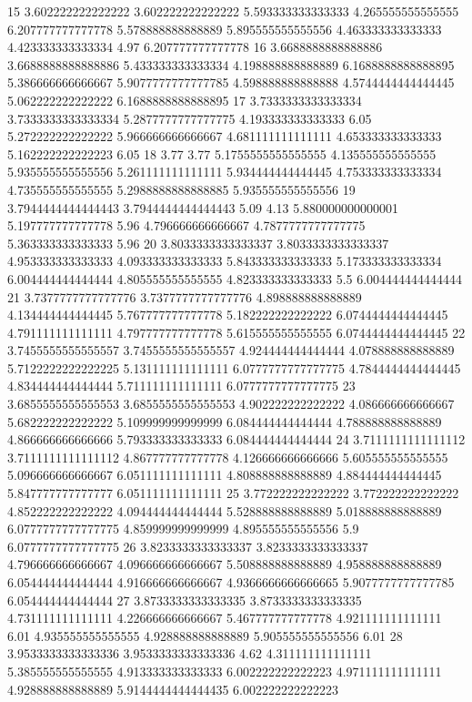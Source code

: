 15 3.602222222222222 3.602222222222222 5.593333333333333 4.265555555555555 6.207777777777778 5.578888888888889 5.895555555555556 4.463333333333333 4.423333333333334 4.97 6.207777777777778
16 3.6688888888888886 3.6688888888888886 5.433333333333334 4.198888888888889 6.1688888888888895 5.386666666666667 5.9077777777777785 4.598888888888888 4.5744444444444445 5.062222222222222 6.1688888888888895
17 3.7333333333333334 3.7333333333333334 5.2877777777777775 4.193333333333333 6.05 5.272222222222222 5.966666666666667 4.681111111111111 4.653333333333333 5.162222222222223 6.05
18 3.77 3.77 5.1755555555555555 4.135555555555555 5.935555555555556 5.261111111111111 5.934444444444445 4.753333333333334 4.735555555555555 5.2988888888888885 5.935555555555556
19 3.7944444444444443 3.7944444444444443 5.09 4.13 5.880000000000001 5.197777777777778 5.96 4.796666666666667 4.7877777777777775 5.363333333333333 5.96
20 3.8033333333333337 3.8033333333333337 4.953333333333333 4.093333333333333 5.843333333333333 5.173333333333334 6.004444444444444 4.805555555555555 4.823333333333333 5.5 6.004444444444444
21 3.7377777777777776 3.7377777777777776 4.898888888888889 4.134444444444445 5.767777777777778 5.182222222222222 6.0744444444444445 4.791111111111111 4.797777777777778 5.615555555555555 6.0744444444444445
22 3.7455555555555557 3.7455555555555557 4.924444444444444 4.078888888888889 5.7122222222222225 5.131111111111111 6.0777777777777775 4.7844444444444445 4.834444444444444 5.711111111111111 6.0777777777777775
23 3.6855555555555553 3.6855555555555553 4.902222222222222 4.086666666666667 5.682222222222222 5.109999999999999 6.084444444444444 4.788888888888889 4.866666666666666 5.793333333333333 6.084444444444444
24 3.7111111111111112 3.7111111111111112 4.867777777777778 4.126666666666666 5.605555555555555 5.096666666666667 6.051111111111111 4.808888888888889 4.884444444444445 5.847777777777777 6.051111111111111
25 3.772222222222222 3.772222222222222 4.852222222222222 4.094444444444444 5.528888888888889 5.018888888888889 6.0777777777777775 4.859999999999999 4.895555555555556 5.9 6.0777777777777775
26 3.8233333333333337 3.8233333333333337 4.796666666666667 4.096666666666667 5.508888888888889 4.958888888888889 6.054444444444444 4.916666666666667 4.9366666666666665 5.9077777777777785 6.054444444444444
27 3.8733333333333335 3.8733333333333335 4.731111111111111 4.226666666666667 5.467777777777778 4.921111111111111 6.01 4.935555555555555 4.928888888888889 5.905555555555556 6.01
28 3.9533333333333336 3.9533333333333336 4.62 4.311111111111111 5.385555555555555 4.913333333333333 6.002222222222223 4.971111111111111 4.928888888888889 5.9144444444444435 6.002222222222223
